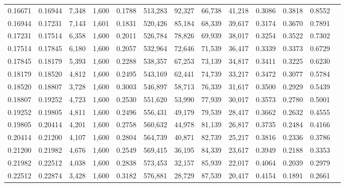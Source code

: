 \begin{tabular}{rrrrrrrrrrrrr}
0.16671 & 0.16944 &  7,348 & 1,600 &                                     0.1788 & 513,283 &  92,327 &  66,738 &  41,218 & 0.3086 & 0.3818 & 0.8552 \\
0.16944 & 0.17231 &  7,143 & 1,601 &                                     0.1831 & 520,426 &  85,184 &  68,339 &  39,617 & 0.3174 & 0.3670 & 0.7891 \\
0.17231 & 0.17514 &  6,358 & 1,600 &                                     0.2011 & 526,784 &  78,826 &  69,939 &  38,017 & 0.3254 & 0.3522 & 0.7302 \\
0.17514 & 0.17845 &  6,180 & 1,600 &                                     0.2057 & 532,964 &  72,646 &  71,539 &  36,417 & 0.3339 & 0.3373 & 0.6729 \\
0.17845 & 0.18179 &  5,393 & 1,600 &                                     0.2288 & 538,357 &  67,253 &  73,139 &  34,817 & 0.3411 & 0.3225 & 0.6230 \\
0.18179 & 0.18520 &  4,812 & 1,600 &                                     0.2495 & 543,169 &  62,441 &  74,739 &  33,217 & 0.3472 & 0.3077 & 0.5784 \\
0.18520 & 0.18807 &  3,728 & 1,600 &                                     0.3003 & 546,897 &  58,713 &  76,339 &  31,617 & 0.3500 & 0.2929 & 0.5439 \\
0.18807 & 0.19252 &  4,723 & 1,600 &                                     0.2530 & 551,620 &  53,990 &  77,939 &  30,017 & 0.3573 & 0.2780 & 0.5001 \\
0.19252 & 0.19805 &  4,811 & 1,600 &                                     0.2496 & 556,431 &  49,179 &  79,539 &  28,417 & 0.3662 & 0.2632 & 0.4555 \\
0.19805 & 0.20414 &  4,201 & 1,600 &                                     0.2758 & 560,632 &  44,978 &  81,139 &  26,817 & 0.3735 & 0.2484 & 0.4166 \\
0.20414 & 0.21200 &  4,107 & 1,600 &                                     0.2804 & 564,739 &  40,871 &  82,739 &  25,217 & 0.3816 & 0.2336 & 0.3786 \\
0.21200 & 0.21982 &  4,676 & 1,600 &                                     0.2549 & 569,415 &  36,195 &  84,339 &  23,617 & 0.3949 & 0.2188 & 0.3353 \\
0.21982 & 0.22512 &  4,038 & 1,600 &                                     0.2838 & 573,453 &  32,157 &  85,939 &  22,017 & 0.4064 & 0.2039 & 0.2979 \\
0.22512 & 0.22874 &  3,428 & 1,600 &                                     0.3182 & 576,881 &  28,729 &  87,539 &  20,417 & 0.4154 & 0.1891 & 0.2661 \\

\end{tabular}
